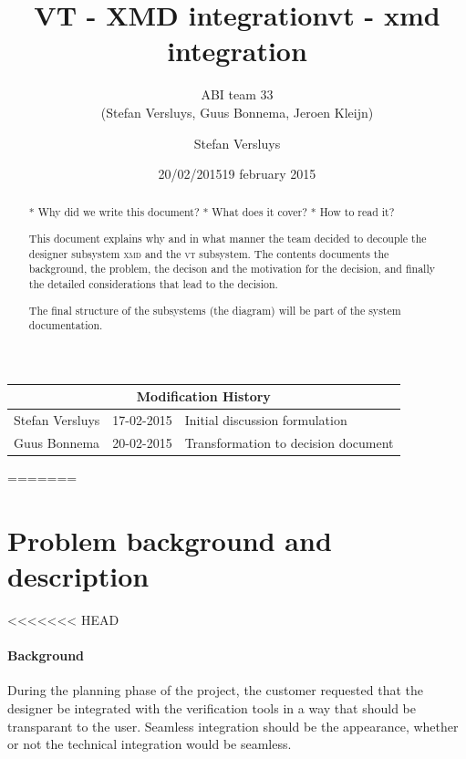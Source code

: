 \documentclass[a4paper,11pt,final]{article}
\author{ABI team 33\\(Stefan Versluys, Guus Bonnema, Jeroen Kleijn)}
\date{20/02/2015}
\title{\color{blue}VT - XMD integration}
\newcommand{\xmd}{\textsc{xmd}\xspace}%
\newcommand{\vt}{\textsc{vt}\xspace}%
\begin{document}

\maketitle

\begin{abstract}

	* Why did we write this document? 
	* What does it cover?
	* How to read it? 
	
	This document explains why and in what manner the team decided 
	to decouple the designer subsystem \xmd and the \vt subsystem.
	The contents documents the background, the problem, the decison
	and the motivation for the decision, and finally the detailed 
	considerations that lead to the decision.
	
	The final structure of the subsystems (the diagram) will be part of 
	the system documentation.
\end{abstract}


\begin{tabular}{|l|l|p{20em}|}
\hline 
\multicolumn{3}{|c|}{\bf Modification History}\\\hline
Stefan Versluys & 17-02-2015 & Initial discussion formulation \\\hline 
Guus Bonnema & 20-02-2015 & Transformation to decision document \\\hline 
\end{tabular} 
=======


\title{\large vt - xmd integration}
\date{19 february 2015}
\author{Stefan Versluys}

\maketitle

\tableofcontents

\section{Problem background and description}

<<<<<<< HEAD
\paragraph{Background}
During the planning phase of the project, the customer requested that
the designer be integrated with the verification tools in a way that
should be transparant to the user. Seamless integration should be the
appearance, whether or not the technical integration would be seamless.
\end{document}
